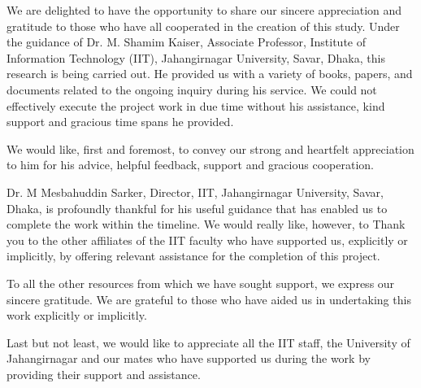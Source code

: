 We are delighted to have the opportunity to share our sincere appreciation and gratitude to those who have all cooperated in the creation of this study. Under the guidance of Dr. M. Shamim Kaiser, Associate Professor, Institute of Information Technology (IIT), Jahangirnagar University, Savar, Dhaka, this research is being carried out. He provided us with a variety of books, papers, and documents related to the ongoing inquiry during his service. We could not effectively execute the project work in due time without his assistance, kind support and gracious time spans he provided.

\vspace{0.25cm}
We would like, first and foremost, to convey our strong and heartfelt appreciation to him for his advice, helpful feedback, support and gracious cooperation. 

\vspace{0.25cm}
Dr. M Mesbahuddin Sarker, Director, IIT, Jahangirnagar University, Savar, Dhaka, is profoundly thankful for his useful guidance that has enabled us to complete the work within the timeline. We would really like, however, to 
Thank you to the other affiliates of the IIT faculty who have supported us, explicitly or implicitly, by offering relevant assistance for the completion of this project.

\vspace{0.25cm}
To all the other resources from which we have sought support, we express our sincere gratitude. We are grateful to those who have aided us in undertaking this work explicitly or implicitly. 

\vspace{0.25cm}
Last but not least, we would like to appreciate all the IIT staff, the University of Jahangirnagar and our mates who have supported us during the work by providing their support and assistance.


